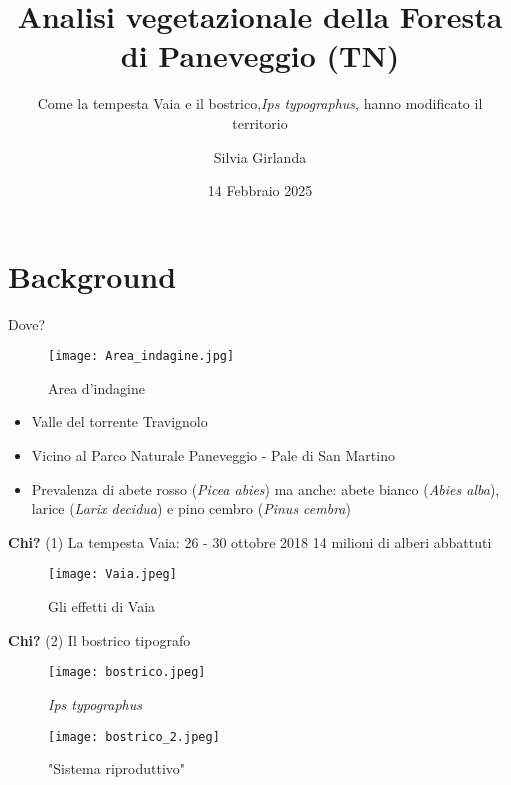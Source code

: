 \documentclass{beamer} %
\title{\textbf{Analisi vegetazionale della Foresta di Paneveggio (TN)}}
\subtitle {Come la tempesta Vaia e il bostrico,\textit{Ips typographus}, hanno modificato il territorio }
\author{Silvia Girlanda}
\date{14 Febbraio 2025}
\begin{document}
\maketitle



\section{Background}

\begin{frame}{Dove?}
\begin{figure}
        \centering
        \texttt{[image: Area\_indagine.jpg]}
        \caption{\scriptsize Area d'indagine}
    \end{figure}
    
    \begin{itemize}
        \item Valle del torrente Travignolo
        \item Vicino al Parco Naturale Paneveggio - Pale di San Martino
        \item Prevalenza di abete rosso (\textit{Picea abies}) ma anche: abete bianco (\textit{Abies alba}), larice (\textit{Larix decidua}) e pino cembro (\textit{Pinus cembra})
    
    \end{itemize}
 \end{frame}

\begin{frame}{\textbf{Chi?} (1) La tempesta Vaia: 26 - 30 ottobre 2018 }
14 milioni di alberi abbattuti
\begin{figure}
    \centering
    \texttt{[image: Vaia.jpeg]}
    \caption{Gli effetti di Vaia}
\end{figure}
\end{frame}

\begin{frame}{\textbf{Chi?} (2) Il bostrico tipografo}
\begin{figure}
    \centering
    \texttt{[image: bostrico.jpeg]}
    \caption{{\textit{Ips typographus}}}
    \texttt{[image: bostrico\_2.jpeg]}
    \caption{"Sistema riproduttivo"}
\end{figure}
\end{frame}
\end{document}
